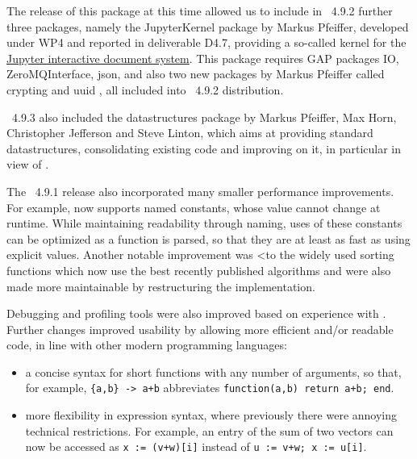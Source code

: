 
The release of this package at this time allowed us to include in \GAP~4.9.2
further three packages, namely the {\sf JupyterKernel} package \cite{JupyterKernel} 
by Markus Pfeiffer, developed under WP4 and reported in deliverable D4.7,
providing a so-called kernel for the
\href{https://jupyter.org/}{Jupyter interactive document system}. This package
requires GAP packages {\sf IO}, {\sf ZeroMQInterface}, {\sf json},
and also two new packages by Markus Pfeiffer called
{\sf crypting} and {\sf uuid} \cite{crypting,uuid}, all included 
into \GAP~4.9.2 distribution.

\GAP~4.9.3 also included the {\sf datastructures} package \cite{datastructures}
by Markus Pfeiffer, Max Horn, Christopher Jefferson and Steve Linton, which aims 
at providing standard datastructures, consolidating existing code and improving 
on it, in particular in view of \HPCGAP.

The \GAP~4.9.1 release also incorporated many smaller performance improvements. For example,
\GAP now supports named constants, whose value cannot change 
at runtime. While maintaining readability through naming, uses of
these constants can be optimized as a function is parsed, so that they
are at least as fast as using explicit values. Another notable improvement was
<to the widely used  sorting functions which now use the best
recently published algorithms and were also made more maintainable by
restructuring the implementation.

Debugging  and profiling tools were also improved based on experience with
. Further changes improved \GAP
usability by allowing more efficient and/or readable code, in line
with other modern programming languages:
\begin{itemize}
  \item a concise syntax for short
    functions with any number of arguments, so that, for example,
    \verb|{a,b} -> a+b| abbreviates \verb|function(a,b) return a+b; end|. 
\item more flexibility in \GAP expression syntax,
  where previously there were annoying technical restrictions. For
  example, an entry of the sum of two vectors can now be accessed as
  \verb|x := (v+w)[i]| instead of \verb|u := v+w; x := u[i]|.
  

\end{itemize}

